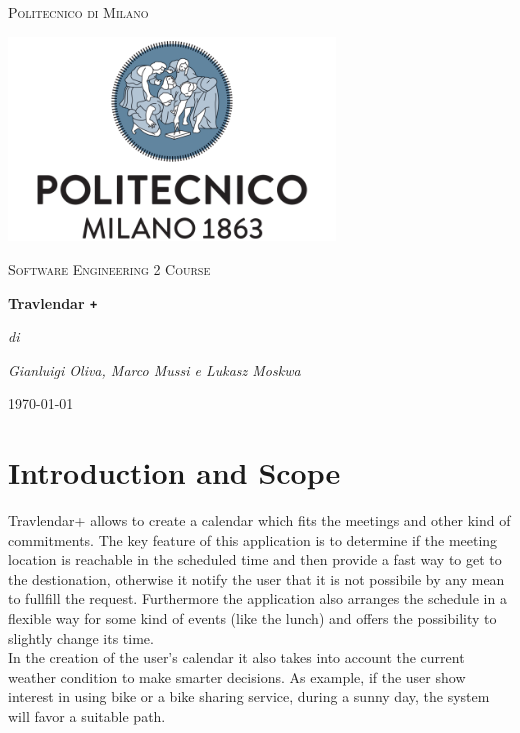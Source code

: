 \documentclass[numbers=noenddot, 12pt, a4paper, oneside]{scrbook}
\def\Plus{\texttt{+}}
\begin{document}
 
\begin{titlepage}
	\centering
	{\scshape\LARGE Politecnico di Milano \par}
	\vspace{1cm}
	\includegraphics[width=0.65\textwidth]{polimi-logo}\par
	\vspace{1cm}
		
	{\scshape\Large Software Engineering 2 Course\par}
	\vspace{1.5cm}
	{\huge\bfseries Travlendar \Plus \par}
	\vspace{6cm}
	{\Large\itshape di\par}
	{\Large\itshape Gianluigi Oliva, Marco Mussi e Lukasz Moskwa\par}
	\vfill

	
	\vfill
	
	{\large \today\par}
\end{titlepage}

\newpage 
\tableofcontents
\newpage 

\chapter{Introduction and Scope}
Travlendar+ allows to create a calendar which fits the meetings and other kind of commitments. The key feature of this application is to determine if the meeting location is reachable in the scheduled time and then provide a fast way to get to the destionation, otherwise it notify the user that it is not possibile by any mean to fullfill the request. Furthermore the application also arranges the schedule in a flexible way for some kind of events (like the lunch) and offers the possibility to slightly change its time.\\
In the creation of the user's calendar it also takes into account the current weather condition to make smarter decisions. As example, if the user show interest in using bike or a bike sharing service, during a sunny day, the system will favor a suitable path.\\\newline
\end{document}
